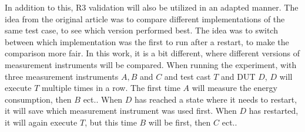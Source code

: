 In addition to this, R3 validation\cite*[]{Bokhari2020r3} will also be utilized in an adapted manner. The idea from the original article was to compare different implementations of the same test case, to see which version performed best. The idea was to switch between which implementation was the first to run after a restart, to make the comparison more fair. In this work, it is a bit different, where different versions of measurement instruments will be compared. When running the experiment, with three measurement instruments $A, B$ and $C$ and test cast $T$ and DUT $D$, $D$ will execute $T$ multiple times in a row. The first time $A$ will measure the energy consumption, then $B$ ect.. When $D$ has reached a state where it needs to restart, it will save which measurement instrument was used first. When $D$ has restarted, it will again execute $T$, but this time $B$ will be first, then $C$ ect..
